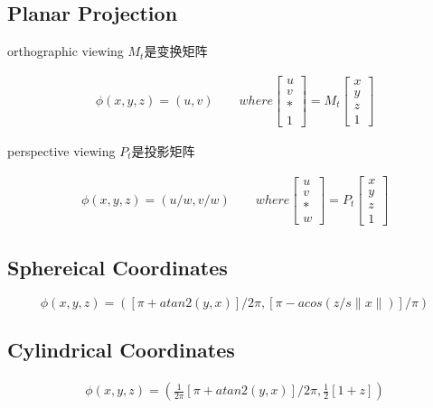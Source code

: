 \subsection{Planar Projection}


orthographic viewing $M_{t}$是变换矩阵

\begin{align*}
    \phi(x,y,z) = (u,v) \qquad where 
    \begin{bmatrix} u \\ v \\ * \\ 1 \end{bmatrix} = M_{t} 
    \begin{bmatrix} x \\ y \\ z \\ 1 \end{bmatrix}
\end{align*}

perspective viewing $P_{t}$是投影矩阵

\begin{align*}
    \phi(x,y,z) = (u/w,v/w) \qquad where 
    \begin{bmatrix} u \\ v \\ * \\ w \end{bmatrix} = P_{t} 
    \begin{bmatrix} x \\ y \\ z \\ 1 \end{bmatrix}
\end{align*}


\subsection{Sphereical Coordinates}

\begin{equation}
    \phi(x,y,z) = ([\pi+atan2(y,x)]/2\pi,[\pi-acos(z/s\|x\|)]/\pi)
\end{equation}

\subsection{Cylindrical Coordinates}

\begin{align*}
    \phi(x,y,z) = (\frac{1}{2\pi}[\pi+atan2(y,x)]/2\pi,\frac{1}{2}[1+z])
\end{align*}


